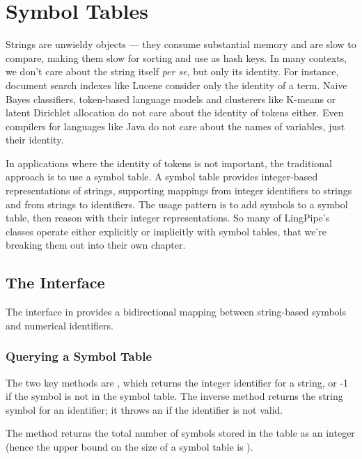 \chapter{Symbol Tables}\label{chap:symbol-tables}

Strings are unwieldy objects --- they consume substantial memory and
are slow to compare, making them slow for sorting and use as hash
keys.  In many contexts, we don't care about the string itself {\it
  per se}, but only its identity.  For instance, document search
indexes like Lucene consider only the identity of a term.  Naive Bayes
classifiers, token-based language models and clusterers like K-means
or latent Dirichlet allocation do not care about the identity of
tokens either.  Even compilers for languages like Java do not care
about the names of variables, just their identity.

In applications where the identity of tokens is not important, the
traditional approach is to use a symbol table.  A symbol table
provides integer-based representations of strings, supporting mappings
from integer identifiers to strings and from strings to identifiers.
The usage pattern is to add symbols to a symbol table, then reason
with their integer representations.  So many of LingPipe's classes
operate either explicitly or implicitly with symbol tables, that
we're breaking them out into their own chapter.

\section{The  Interface}

The interface  in  provides
a bidirectional mapping between string-based symbols and numerical
identifiers. 

\subsection{Querying a Symbol Table}

The two key methods are , which returns the
integer identifier for a string, or -1 if the symbol is not in the
symbol table.  The inverse method  returns the
string symbol for an identifier; it throws an
 if the identifier is not valid.  

The method  returns the total number of symbols
stored in the table as an integer (hence the upper bound on the size
of a symbol table is ).

